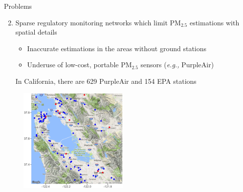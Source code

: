 \documentclass[handout]{beamer} %
\begin{document}
\begin{frame}{Problems}
    \begin{enumerate}
        \setcounter{enumi}{1}
        \item Sparse regulatory monitoring networks which limit PM$_{2.5}$ estimations with spatial details
            \begin{itemize}
                \item \textcolor[rgb]{1,0.4,0}{Inaccurate estimations in the areas without ground stations}
                \item \textcolor[rgb]{1,0.4,0}{Underuse of low-cost, portable PM$_{2.5}$ sensors (\textit{e.g.,} PurpleAir)}
            \end{itemize}
        \textcolor[rgb]{0.1,0.1,0.6}{In California, there are 629 PurpleAir and 154 EPA stations}
    \end{enumerate}
    \vspace{-0.2cm}
    \begin{figure}
        \centering
        \includegraphics[width=0.48\textwidth]{img/bayarea.jpg}
    \end{figure}
\end{frame}
\end{document}
